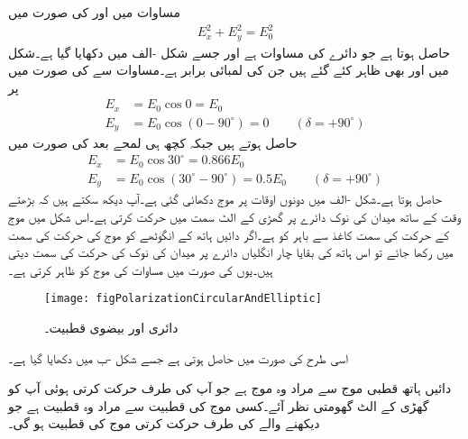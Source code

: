 مساوات  میں  اور  کی صورت میں
\begin{align}\label{مساوات_قطبیت_عمومی_دائری_قطبیت}
E_x^2 +E_y^2=E_{0}^2
\end{align}
حاصل ہوتا ہے جو دائرے کی مساوات ہے اور جسے شکل -الف میں دکھایا گیا ہے۔شکل میں  اور  بھی ظاہر کئے گئے ہیں جن کی لمبائی برابر ہے۔مساوات  سے  کی صورت میں  پر 
\begin{align*}
E_x&=E_{0} \cos 0=E_{0}\\  
E_y&=E_{0} \cos (0  -90^\circ) =0  \quad \quad (\delta =+90^\circ)
\end{align*}
حاصل ہوتے ہیں جبکہ کچھ ہی لمحے بعد  کی صورت میں
\begin{align*}
E_x&=E_{0} \cos 30^\circ=0.866 E_{0} \\
E_y&=E_{0} \cos (30^\circ  -90^\circ) =0.5 E_{0} \quad \quad (\delta =+90^\circ)
\end{align*}
حاصل ہوتا ہے۔شکل -الف میں دونوں اوقات پر موج دکھائی گئی ہے۔آپ دیکھ سکتے ہیں کہ بڑھتے وقت کے ساتھ میدان کی نوک دائرے پر گھڑی کے الٹ سمت میں حرکت کرتی ہے۔اس شکل میں موج کے حرکت کی سمت  کاغذ سے باہر کو ہے۔اگر دائیں ہاتھ کے انگوٹھے کو موج کی حرکت کی سمت میں رکھا جائے تو اس ہاتھ کی بقایا چار انگلیاں دائرے پر میدان کی نوک کی حرکت کی سمت دیتی ہیں۔یوں  کی صورت میں مساوات   کی موج کو ظاہر کرتی ہے۔   
\begin{figure}
\centering
\texttt{[image: figPolarizationCircularAndElliptic]}
\caption{دائری اور بیضوی قطبیت۔}
\label{شکل_قطبیت_دائری_اور_بیضوی_قطبیت}
\end{figure}

اسی طرح  کی صورت میں  حاصل ہوتی ہے جسے شکل -ب میں دکھایا گیا ہے۔

دائیں ہاتھ قطبی موج سے مراد وہ موج ہے جو آپ کی طرف حرکت کرتی ہوئی آپ کو گھڑی کے الٹ گھومتی نظر آئے۔کسی موج کی قطبیت سے مراد وہ قطبیت ہے جو دیکھنے والے کی طرف حرکت کرتی موج کی قطبیت ہو گی۔

